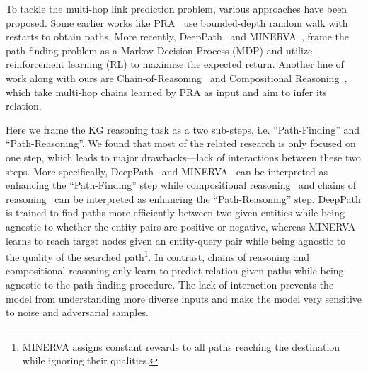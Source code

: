 \documentclass[11pt,a4paper]{article}
\begin{document}
To tackle the multi-hop link prediction problem, various approaches have been proposed. Some earlier works like PRA~\cite{lao2011random,gardner2014incorporating,gardner2013improving} use bounded-depth random walk with restarts
to obtain paths. More recently, DeepPath~\cite{xiong2017deeppath} and MINERVA~\cite{das2017go}, frame the path-finding problem as a Markov Decision Process (MDP) and utilize reinforcement learning (RL) to maximize the expected return. Another line of work along with ours are Chain-of-Reasoning~\cite{das2016chains} and Compositional Reasoning~\cite{neelakantan2015compositional}, which take multi-hop chains learned by PRA as input and aim to infer its relation.

Here we frame the KG reasoning task as a two sub-steps, i.e. ``Path-Finding'' and ``Path-Reasoning''. We found that most of the related research is only focused on one step, which leads to major drawbacks---lack of interactions between these two steps. More specifically, DeepPath~\cite{xiong2017deeppath} and MINERVA~\cite{das2017go} can be interpreted as enhancing the ``Path-Finding'' step while compositional reasoning~\cite{neelakantan2015compositional} and chains of reasoning~\cite{das2016chains} can be interpreted as enhancing the ``Path-Reasoning'' step. DeepPath is trained to find paths more efficiently between two given entities while being agnostic to whether the entity pairs are positive or negative, whereas MINERVA learns to reach target nodes given an entity-query pair while being agnostic to the quality of the searched path\footnote{MINERVA assigns constant rewards to all paths reaching the destination while ignoring their qualities.}. In contrast, chains of reasoning and compositional reasoning only learn to predict relation given paths while being agnostic to the path-finding procedure. The lack of interaction prevents the model from understanding more diverse inputs and make the model very sensitive to noise and adversarial samples. 
\end{document}
